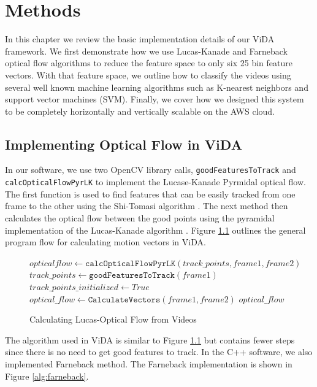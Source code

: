 \chapter{Methods}
In this chapter we review the basic implementation details of our ViDA
framework. We first demonstrate how we use Lucas-Kanade and Farneback optical
flow algorithms to reduce the feature space to only six 25 bin feature vectors.
With that feature space, we outline how to classify the videos using several
well known machine learning algorithms such as K-nearest neighbors and support
vector machines (SVM). Finally, we cover how we designed this system to be
completely horizontally and vertically scalable on the AWS cloud.


\section{\label{section:vida_oflow} Implementing Optical Flow in ViDA}
In our software, we use two OpenCV library calls, \texttt{goodFeaturesToTrack}
and \\
\texttt{calcOpticalFlowPyrLK} to implement the Lucase-Kanade Pyrmidal optical
flow. The first function is used to find features that can be easily tracked
from one frame to the other using the Shi-Tomasi algorithm \cite{shi1994good}.
The next method then calculates the optical flow between the good points using
the pyramidal implementation of the Lucas-Kanade algorithm
\cite{bouguet2001pyramidal}. Figure \ref{alg:lk_flow} outlines the general
program flow for calculating motion vectors in ViDA.

\begin{figure}[h]
\begin{algorithmic}[1]
  	\State $opticalflow \gets \texttt{calcOpticalFlowPyrLK}(track\_points, frame1, frame2)$
  \Else
  	\State $track\_points \gets \texttt{goodFeaturesToTrack}(frame1)$
	  \State $track\_points\_initialized \gets True$
	  \State $optical\_flow \gets  \texttt{CalculateVectors}(frame1, frame2)$
  \EndIf
  \Return $optical\_flow$
\EndProcedure
\end{algorithmic}
\caption{Calculating Lucas-Optical Flow from Videos}
\label{alg:lk_flow}
\end{figure}

The algorithm used in ViDA is similar to Figure \ref{alg:lk_flow} but
contains fewer steps since there is no need to get good features to track.
In the C++ software, we also implemented Farneback method. The
Farneback implementation is shown in Figure \ref{alg:farneback}.

